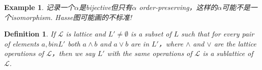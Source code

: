 \documentclass{article}
\newtheorem{example}[theorem]{Example}
\newtheorem{definition}[theorem]{Definition}
\newcommand\lattice{\mathcal{L}}
\begin{document}
\begin{example}
\rm 记录一个$\alpha$是bijective但只有$\alpha$ order-preserving，这样的$\alpha$可能不是一个isomorphism. Hasse图可能画的不标准!
\begin{center}
\end{center}
\end{example}

\begin{definition}
\rm If $\lattice$ is lattice and $L' \neq \emptyset$ is a subset of $L$ such that for every pair of elements $a,b in L'$ both $a \wedge b$ and $a \vee b$ are in $L'$，where $\wedge$ and $\vee$ are the lattice operations of $\lattice$，then we say $L'$ with the same operations of $\lattice$ is a {\color{red} sublattice} of $\lattice$. 
\end{definition}

\newpage
\end{document}

